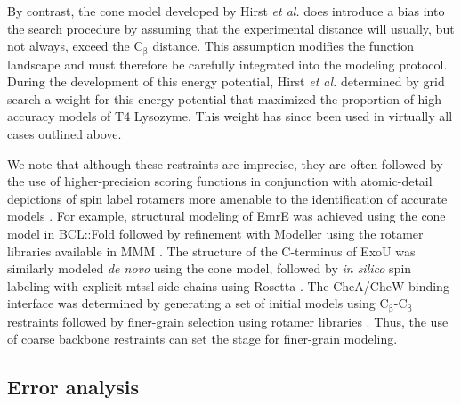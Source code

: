 By contrast, the \gls{cone} model developed by Hirst \emph{et al.} does introduce a bias into the search procedure by assuming that the experimental distance will usually, but not always, exceed the $\mathrm{C_{\upbeta}}$ distance. This assumption modifies the function landscape and must therefore be carefully integrated into the modeling protocol. During the development of this energy potential, Hirst \emph{et al.} determined by grid search a weight for this energy potential that maximized the proportion of high-accuracy models of T4 Lysozyme. This weight has since been used in virtually all cases outlined above.

We note that although these restraints are imprecise, they are often followed by the use of higher-precision scoring functions in conjunction with atomic-detail depictions of spin label rotamers more amenable to the identification of accurate models \citep*{Sarver2018}. For example, structural modeling of EmrE was achieved using the \gls{cone} model in BCL::Fold followed by refinement with Modeller using the rotamer libraries available in MMM \citep*{Dastvan2016}. The structure of the C-terminus of ExoU was similarly modeled \emph{de novo} using the \gls{cone} model, followed by \emph{in silico} spin labeling with explicit \gls{mtssl} side chains using Rosetta \citep*{Fischer2017}. The CheA/CheW binding interface was determined by generating a set of initial models using $\mathrm{C_{\upbeta}}$-$\mathrm{C_{\upbeta}}$ restraints followed by finer-grain selection using rotamer libraries \citep*{Bhatnagar2007}. Thus, the use of coarse backbone restraints can set the stage for finer-grain modeling.

\subsection{Error analysis}

